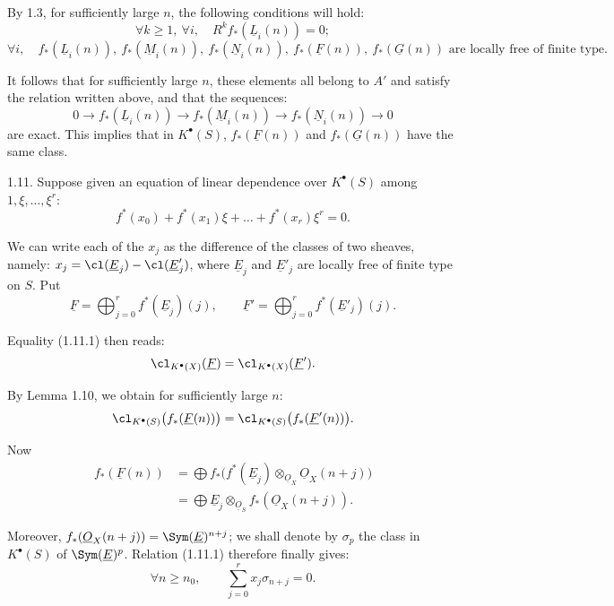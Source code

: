 By 1.3, for sufficiently large \(n\), the following conditions will hold:
\[
  \forall k\geq1,\ \forall i,
  \quad R^k f_*(\underline{L}_i(n))=0;
\]
\[
  \forall i,
  \quad f_*(\underline{L}_i(n)),\ f_*(\underline{M}_i(n)),\ f_*(\underline{N}_i(n)),\ f_*(\underline{F}(n)),\ f_*(\underline{G}(n))
  \text{ are locally free of finite type.}
\]

It follows that for sufficiently large \(n\), these elements all belong to \(A'\) and satisfy the relation written above, and that the sequences:
\[
  0\longrightarrow f_*(\underline{L}_i(n))\longrightarrow f_*(\underline{M}_i(n))\longrightarrow f_*(\underline{N}_i(n))\longrightarrow0
\]
are exact. This implies that in \(K^{\bullet}(S)\), \(f_*(\underline{F}(n))\) and \(f_*(\underline{G}(n))\) have the same class.

1.11. Suppose given an equation of linear dependence over \(K^{\bullet}(S)\) among \(1,\xi,\ldots,\xi^r\):
\begin{equation}\tag{1.11.1}
  f^*(x_0)+f^*(x_1)\xi+\ldots+f^*(x_r)\xi^r=0.
\end{equation}

We can write each of the \(x_j\) as the difference of the classes of two sheaves, namely: \(x_j=\cl(\underline{E}_j)-\cl(\underline{E}'_j)\), where \(\underline{E}_j\) and \(\underline{E}'_j\) are locally free of finite type on \(S\). Put
\[
  \underline{F}=\bigoplus_{j=0}^r f^*(\underline{E}_j)(j),
  \qquad
  \underline{F}'=\bigoplus_{j=0}^r f^*(\underline{E}'_j)(j).
\]

Equality (1.11.1) then reads:
\[
  \cl_{K^{\bullet}(X)}(\underline{F})=\cl_{K^{\bullet}(X)}(\underline{F}').
\]

By Lemma 1.10, we obtain for sufficiently large \(n\):
\[
  \cl_{K^{\bullet}(S)}\bigl(f_*(\underline{F}(n))\bigr)=\cl_{K^{\bullet}(S)}\bigl(f_*(\underline{F}'(n))\bigr).
\]

%
Now
\[
\begin{aligned}
  f_*(\underline{F}(n))
  &=\bigoplus f_*\bigl(f^*(\underline{E}_j)\otimes_{\underline{O}_X}\underline{O}_X(n+j)\bigr)\\
  &=\bigoplus \underline{E}_j\otimes_{\underline{O}_S} f_*(\underline{O}_X(n+j)).
\end{aligned}
\]

Moreover, \(f_*(\underline{O}_X(n+j))=\Sym(\underline{E})^{n+j}\); we shall denote by \(\sigma_p\) the class in \(K^{\bullet}(S)\) of \(\Sym(\underline{E})^p\). Relation (1.11.1) therefore finally gives:
\begin{equation}\tag{1.11.2}
  \forall n\geq n_0,
  \qquad
  \sum_{j=0}^r x_j\sigma_{n+j}=0.
\end{equation}

